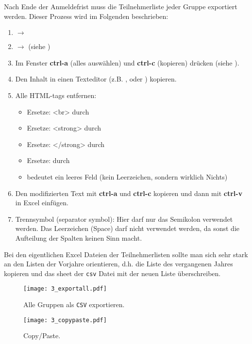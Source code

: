 Nach Ende der Anmeldefrist muss die Teilnehmerliste jeder Gruppe exportiert
werden. Dieser Prozess wird im Folgenden beschrieben:
\begin{enumerate}
  \item {} $\to$  
  \item {} $\to$  (siehe )
  \item Im Fenster  {\bf ctrl-a} (alles auswählen) und 
    {\bf ctrl-c} (kopieren) drücken (siehe ).
 \item Den Inhalt in einen Texteditor (z.B. , 
    oder ) kopieren.
 \item Alle HTML-tags entfernen:
    \begin{itemize}
      \item Ersetze: <br> durch 
      \item Ersetze: <strong> durch 
      \item Ersetze: </strong> durch 
      \item Ersetze: \grqq{} durch  \footnotemark[2]
      \item {} bedeutet ein leeres Feld (kein Leerzeichen, sondern
        wirklich Nichts)
    \end{itemize}
  \item Den modifizierten Text mit {\bf ctrl-a} und {\bf ctrl-c} kopieren und
    dann mit {\bf ctrl-v} in Excel einfügen.
  \item Trennsymbol (\glqq{}separator symbol\grqq{}): Hier darf nur das
    Semikolon verwendet werden. Das Leerzeichen (Space) darf nicht verwendet
    werden, da sonst die Aufteilung der Spalten keinen Sinn macht.
\end{enumerate}


Bei den eigentlichen Excel Dateien der Teilnehmerlisten sollte man sich sehr
stark an den Listen der Vorjahre orientieren, d.h. die Liste des vergangenen
Jahres kopieren und das sheet der {\tt csv} Datei mit der neuen Liste
überschreiben.

\begin{figure}[htbp]
\begin{center}
  \texttt{[image: 3\_exportall.pdf]}
  \caption{ Alle Gruppen als {\tt CSV} exportieren.}
  \label{fig:exportall}
\end{center}
\end{figure}

\begin{figure}[htbp]
\begin{center}
  \texttt{[image: 3\_copypaste.pdf]}
  \caption{ Copy/Paste.}
  \label{fig:copypaste}
\end{center}
\end{figure}

